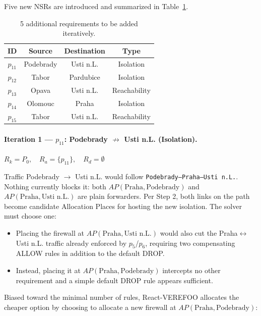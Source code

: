 Five new NSRs are introduced and summarized in Table~\ref{tab:cesnet-new}.

\begin{table}[H]
\centering
\caption{5 additional requirements to be added iteratively.}
\label{tab:cesnet-new}
\begin{tabular}{cccc}
\hline
\textbf{ID} & \textbf{Source} & \textbf{Destination} & \textbf{Type} \\
\hline
$p_{11}$ & Podebrady & Usti n.L.  & Isolation \\
$p_{12}$ & Tabor     & Pardubice  & Isolation \\
$p_{13}$ & Opava     & Usti n.L.  & Reachability \\
$p_{14}$ & Olomouc   & Praha      & Isolation \\
$p_{15}$ & Tabor     & Usti n.L.  & Reachability \\
\hline
\end{tabular}
\end{table}

\paragraph{Iteration 1 — $p_{11}$: Podebrady $\not\to$ Usti n.L. (Isolation).}

\begin{center}
$R_k = P_0,\quad R_a = \{p_{11}\},\quad R_d = \emptyset$
\end{center}

Traffic Podebrady $\to$ Usti n.L. would follow \texttt{Podebrady–Praha–Usti n.L.}. Nothing currently blocks it: both $\mathit{AP}(\text{Praha},\text{Podebrady})$ and $\mathit{AP}(\text{Praha},\text{Usti n.L.})$ are plain forwarders. Per Step 2, both links on the path become candidate Allocation Places for hosting the new isolation. The solver must choose one:
\begin{itemize}
  \item Placing the firewall at $\mathit{AP}(\text{Praha},\text{Usti n.L.})$ would also cut the Praha$\leftrightarrow$Usti n.L. traffic already enforced by $p_5$/$p_6$, requiring two compensating ALLOW rules in addition to the default DROP.
  \item Instead, placing it at $\mathit{AP}(\text{Praha},\text{Podebrady})$ intercepts no other requirement and a simple default DROP rule appears sufficient.
\end{itemize}
Biased toward the minimal number of rules, React-VEREFOO allocates the cheaper option by choosing to allocate a new firewall at $\mathit{AP}(\text{Praha},\text{Podebrady})$:

